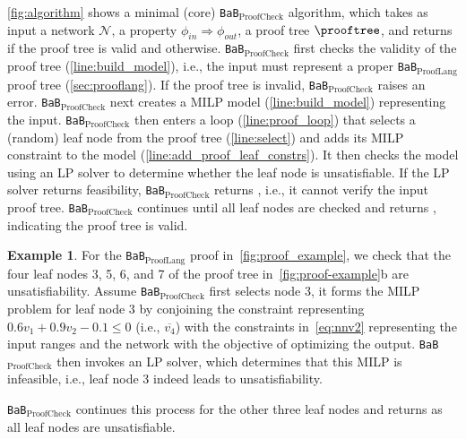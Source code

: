 \documentclass[oneside,11pt,dvipsnames]{book}
\numberwithin{equation}{section}
\theoremstyle{definition}
\newtheorem{example}{Example}[section]
\theoremstyle{remark}
\newcommand{\tvn}[1]{\iftoggle{usecomment}{{\color{red}{[TVN]: #1}}}{}}
\newcommand{\hd}[1]{\iftoggle{usecomment}{{\color{blue}{[HD]: #1}}}{}}
\newcommand{\prooflang}{\texttt{BaB$_{\text{ProofLang}}$}}
\newcommand{\proofcheck}{\texttt{BaB$_{\text{ProofCheck}}$}}
\begin{document}
\autoref{fig:algorithm} shows a minimal (core)  \proofcheck{} algorithm, which takes as input a network $\mathcal{N}$, a property $\phi_{in} \Rightarrow \phi_{out}$, a proof tree $\prooftree$, and returns \certified if the proof tree is valid and \uncertified otherwise.
\proofcheck{} first checks the validity of the proof tree (\autoref{line:build_model}), i.e., the input must represent a proper \prooflang{} proof tree (\autoref{sec:prooflang}).
If the proof tree is invalid, \proofcheck{} raises an error.
\proofcheck{} next creates a MILP model (\autoref{line:build_model}) representing the input. %
\proofcheck{} then enters a loop (\autoref{line:proof_loop}) that selects a (random) leaf node from the proof tree (\autoref{line:select}) and adds its MILP constraint to the model (\autoref{line:add_proof_leaf_constrs}). It then checks the model using an LP solver to determine whether the leaf node is unsatisfiable. If the LP solver returns feasibility, \proofcheck{} returns \uncertified, i.e., it cannot verify the input proof tree.
\proofcheck{} continues until all leaf nodes are checked and returns \certified, indicating the proof tree is valid.



\begin{example}
    For the \prooflang{} proof in~\autoref{fig:proof_example}, we check that the four leaf nodes 3, 5, 6, and 7 of the proof tree in~\autoref{fig:proof-example}b are unsatisfiability. Assume \proofcheck{} first selects node 3, it forms the MILP problem for leaf node 3 by conjoining the constraint representing $0.6v_1 + 0.9v_2 - 0.1 \le 0$ (i.e., $\overline{v_4}$) %
with the constraints in~\autoref{eq:nnv2} representing the input ranges and the network with the objective of optimizing the output. \proofcheck{} then invokes an LP solver, which determines that this MILP is infeasible, i.e., leaf node 3 indeed leads to unsatisfiability.

\proofcheck{} continues this process for the other three leaf nodes and returns \certified as all leaf nodes are unsatisfiable.
\end{example}

\end{document}
